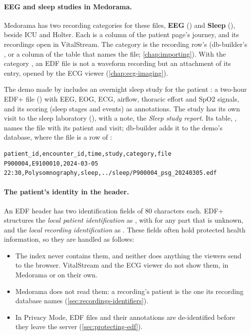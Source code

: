 \paragraph{EEG and sleep studies in Medorama.} Medorama has two recording categories for these
files, \textbf{EEG} () and \textbf{Sleep} (), beside ICU and Holter. Each is
a column of the patient page's journey, and its recordings open in VitalStream. The category is
the recording row's (db-builder's , or a  column of the table
that names the file; \cref{chap:importing}). With the category , an EDF file is not a
waveform recording but an attachment of its entry, opened by the ECG viewer
(\cref{chap:ecg-imaging}).

The demo made by  includes an overnight sleep study for the
patient : a two-hour EDF+ file () with EEG,
EOG, ECG, airflow, thoracic effort and SpO2 signals, and its scoring (sleep stages and events) as
annotations. The study has its own visit to the sleep laboratory (), with a note,
the \emph{Sleep study report}. Its table, , names the file with its patient
and visit; db-builder adds it to the demo's database, where the file is a row of
:
\begin{lstlisting}[style=text]
patient_id,encounter_id,time,study,category,file
P900004,E9100010,2024-03-05 22:30,Polysomnography,sleep,../sleep/P900004_psg_20240305.edf
\end{lstlisting}


\paragraph{The patient's identity in the header.} An EDF header has two identification fields of
80 characters each. EDF+ structures the \emph{local patient identification} as
, with  for any part that is unknown, and the \emph{local
recording identification} as . These
fields often hold protected health information, so they are handled as follows:
\begin{itemize}
\item The index never contains them, and neither does anything the viewers send to the browser.
  VitalStream and the ECG viewer do not show them, in Medorama or on their own.
\item Medorama does not read them: a recording's patient is the one its recording database names
  (\cref{sec:recordings-identifiers}).
\item In Privacy Mode, EDF files and their annotations are de-identified before they leave the
  server (\cref{sec:protecting-edf}).
\end{itemize}

